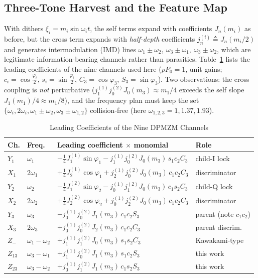 \documentclass[journal]{IEEEtran}
\begin{document}
\subsection{Three-Tone Harvest and the Feature Map}
With dithers $\xi_i=m_i\sin\omega_it$, the self terms expand with
coefficients $J_n(m_i)$ as before, but the cross term expands with
\emph{half-depth} coefficients $j_n^{(i)}\triangleq J_n(m_i/2)$ and
generates intermodulation (IMD) lines
$\omega_1{\pm}\omega_2,\ \omega_3{\pm}\omega_1,\ \omega_3{\pm}\omega_2$,
which are legitimate information-bearing channels rather than
parasitics. Table~\ref{tab:dpchan} lists the leading coefficients of
the nine channels used here ($\rho P_0{=}1$, unit gains;
$c_i{=}\cos\frac{\varphi_i}{2}$, $s_i{=}\sin\frac{\varphi_i}{2}$,
$C_3{=}\cos\varphi_3$, $S_3{=}\sin\varphi_3$). Two observations: the
cross coupling is \emph{not} perturbative
($j_1^{(1)}j_0^{(2)}J_0(m_3)\approx m_1/4$ exceeds the self slope
$J_1(m_1)/4\approx m_1/8$), and the frequency plan must keep the set
$\{\omega_i,2\omega_i,\omega_1{\pm}\omega_2,\omega_3{\pm}\omega_{1,2}\}$
collision-free (here $\omega_{1,2,3}=1,1.37,1.93$).

\begin{table}[!t]
\caption{Leading Coefficients of the Nine DPMZM Channels}
\label{tab:dpchan}
\centering
\scriptsize
\setlength{\tabcolsep}{2pt}
\begin{tabular}{llll}
\toprule
Ch. & Freq. & Leading coefficient $\times$ monomial & Role\\
\midrule
$Y_1$ & $\omega_1$ & $-\frac14J_1^{(1)}\sin\varphi_1-j_1^{(1)}j_0^{(2)}J_0(m_3)\,s_1c_2C_3$ & child-I lock\\
$X_1$ & $2\omega_1$ & $+\frac14J_2^{(1)}\cos\varphi_1+j_2^{(1)}j_0^{(2)}J_0(m_3)\,c_1c_2C_3$ & discriminator\\
$Y_2$ & $\omega_2$ & $-\frac14J_1^{(2)}\sin\varphi_2-j_0^{(1)}j_1^{(2)}J_0(m_3)\,c_1s_2C_3$ & child-Q lock\\
$X_2$ & $2\omega_2$ & $+\frac14J_2^{(2)}\cos\varphi_2+j_0^{(1)}j_2^{(2)}J_0(m_3)\,c_1c_2C_3$ & discriminator\\
$Y_3$ & $\omega_3$ & $-j_0^{(1)}j_0^{(2)}J_1(m_3)\,c_1c_2S_3$ & parent (note $c_1c_2$)\\
$X_3$ & $2\omega_3$ & $+j_0^{(1)}j_0^{(2)}J_2(m_3)\,c_1c_2C_3$ & parent discrim.\\
$Z_-$ & $\omega_1{-}\omega_2$ & $+j_1^{(1)}j_1^{(2)}J_0(m_3)\,s_1s_2C_3$ & Kawakami-type \cite{kawakami2012}\\
$Z_{13}$ & $\omega_3{-}\omega_1$ & $+j_1^{(1)}j_0^{(2)}J_1(m_3)\,s_1c_2S_3$ & this work\\
$Z_{23}$ & $\omega_3{-}\omega_2$ & $+j_0^{(1)}j_1^{(2)}J_1(m_3)\,c_1s_2S_3$ & this work\\
\bottomrule
\end{tabular}
\end{table}
\end{document}
